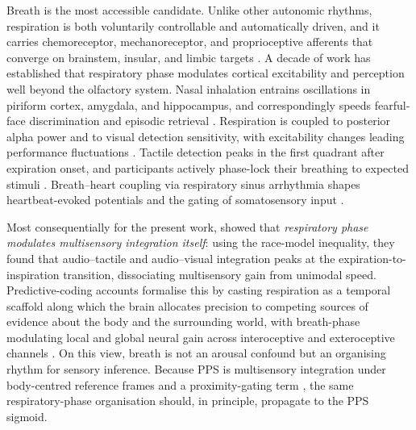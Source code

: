 Breath is the most accessible candidate. Unlike other autonomic rhythms, respiration is both voluntarily controllable and automatically driven, and it carries chemoreceptor, mechanoreceptor, and proprioceptive afferents that converge on brainstem, insular, and limbic targets \citep{Chan2024, Varga2017, heck2017breathing, Zelano2022}. A decade of work has established that respiratory phase modulates cortical excitability and perception well beyond the olfactory system. Nasal inhalation entrains oscillations in piriform cortex, amygdala, and hippocampus, and correspondingly speeds fearful-face discrimination and episodic retrieval \citep{zelano2016nasal, mizuhara_2023}. Respiration is coupled to posterior alpha power and to visual detection sensitivity, with excitability changes leading performance fluctuations \citep{kluger_2021}. Tactile detection peaks in the first quadrant after expiration onset, and participants actively phase-lock their breathing to expected stimuli \citep{grund_2021}. Breath--heart coupling via respiratory sinus arrhythmia shapes heartbeat-evoked potentials and the gating of somatosensory input \citep{Zaccaro2022, Heck2022}.

Most consequentially for the present work, \citet{saltafossi_2025} showed that \emph{respiratory phase modulates multisensory integration itself}: using the race-model inequality, they found that audio--tactile and audio--visual integration peaks at the expiration-to-inspiration transition, dissociating multisensory gain from unimodal speed. Predictive-coding accounts formalise this by casting respiration as a temporal scaffold along which the brain allocates precision to competing sources of evidence about the body and the surrounding world, with breath-phase modulating local and global neural gain across interoceptive and exteroceptive channels \citep{allen_2021, braendholt_2023, engelen_2023}. On this view, breath is not an arousal confound but an organising rhythm for sensory inference. Because PPS is multisensory integration under body-centred reference frames and a proximity-gating term \citep{noel_2018, bertoni_2025}, the same respiratory-phase organisation should, in principle, propagate to the PPS sigmoid.

